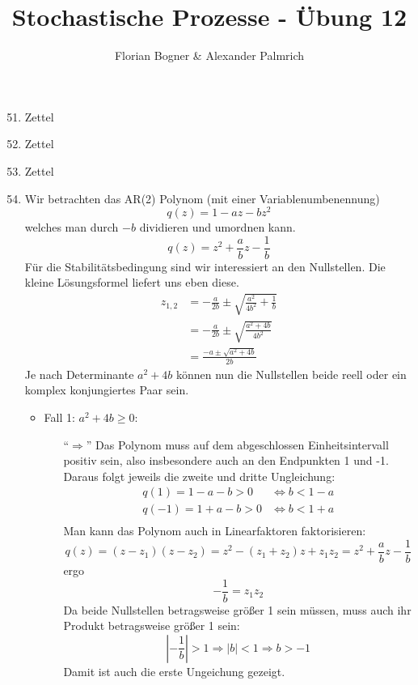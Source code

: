 \documentclass[a4paper,11pt,notitlepage,fullpage]{article}
\begin{document}
\author{Florian Bogner \& Alexander Palmrich}
\title{Stochastische Prozesse - Übung 12}
\maketitle

\begin{enumerate}
\setcounter{enumi}{50}


\item Zettel

\item Zettel

\item Zettel

\item Wir betrachten das AR(2) Polynom (mit einer Variablenumbenennung) $$q(z) = 1 - az - bz^2$$ welches man durch $-b$ dividieren und umordnen kann. $$q(z) = z^2 + \frac{a}{b}z - \frac{1}{b}$$ Für die Stabilitätsbedingung sind wir interessiert an den Nullstellen. Die kleine Lösungsformel liefert uns eben diese. 
\begin{align*}
z_{1,2} &= -\frac{a}{2b} \pm \sqrt{\frac{a^2}{4b^2} + \frac{1}{b}} \\
&= -\frac{a}{2b} \pm \sqrt{\frac{a^2 + 4b}{4b^2}} \\
&= \frac{-a \pm \sqrt{a^2 + 4b}}{2b}
\end{align*}
Je nach Determinante $a^2+4b$ können nun die Nullstellen beide reell oder ein komplex konjungiertes Paar sein.
\begin{itemize}
\item Fall 1: $a^2 + 4b \geq 0$:
\begin{itemize}
\item[``$\Rightarrow$''] Das Polynom muss auf dem abgeschlossen Einheitsintervall positiv sein, also insbesondere auch an den Endpunkten 1 und -1. Daraus folgt jeweils die zweite und dritte Ungleichung:
\begin{align*}
q(1) = 1 - a - b > 0 &\Leftrightarrow b < 1 - a \\
q(-1) = 1 + a - b > 0 &\Leftrightarrow b < 1 + a \\
\end{align*}
Man kann das Polynom auch in Linearfaktoren faktorisieren:
$$q(z) = (z-z_1)(z-z_2) = z^2 - (z_1+z_2)z + z_1z_2 = z^2 + \frac{a}{b}z - \frac{1}{b}$$
ergo
$$-\frac{1}{b} = z_1 z_2$$
Da beide Nullstellen betragsweise größer 1 sein müssen, muss auch ihr Produkt betragsweise größer 1 sein:
$$\left|-\frac{1}{b}\right| > 1 \Rightarrow |b| < 1 \Rightarrow b > -1$$
Damit ist auch die erste Ungeichung gezeigt.


\end{itemize}
\end{itemize}
\end{enumerate}
\end{document}
